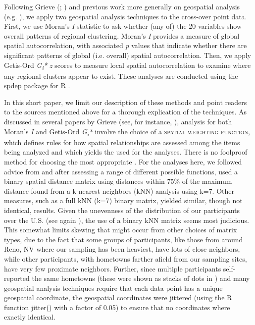 \documentclass[output=paper]{LSP/langsci}
\begin{document}
Following Grieve (\citealt{grieve_corpus-based_2009}; \citealt{grieve_statistical_2011,grieve_multivariate_2013}) and previous work more generally on geospatial analysis (e.g. \citealt{moran_notes_1950,ord_local_1995}), we apply two geospatial analysis techniques to the cross-over point data. First, we use Moran’s \textit{I} statistic to ask whether (any of) the 20 variables show overall patterns of regional clustering. Moran’s \textit{I }provides a measure of global spatial autocorrelation, with associated \textit{p} values that indicate whether there are significant patterns of global (i.e. overall) spatial autocorrelation. Then, we apply Getis-Ord \textit{G}\textit{\textsubscript{i}}\textit{*} \textit{z }scores to measure local spatial autocorrelation to examine where any regional clusters appear to exist. These analyses are conducted using the spdep package for R \citep{bivand_spdep._2014}.

In this short paper, we limit our description of these methods and point readers to the sources mentioned above for a thorough explication of the techniques. As discussed in several papers by Grieve (see, for instance, \citealt{grieve_comparison_2014}), analysis for both Moran’s \textit{I} and Getis-Ord \textit{G}\textit{\textsubscript{i}}\textit{*} involve the choice of a \textsc{spatial weighting function}, which defines rules for how spatial relationships are assessed among the items being analyzed and which yields the \textsc{} used for the analyses. There is no foolproof method for choosing the most appropriate . For the analyses here, we followed advice from \citet{bivand_creating_2014} and after assessing a range of different possible functions, used a binary spatial distance matrix using distances within 75\% of the maximum distance found from a k-nearest neighbors (kNN) analysis using k=7. Other measures, such as a full kNN (k=7) binary matrix, yielded similar, though not identical, results. Given the unevenness of the distribution of our participants over the U.S. (see again ), the use of a binary kNN matrix seems most judicious. This somewhat limits skewing that might occur from other choices of matrix types, due to the fact that some groups of participants, like those from around Reno, NV where our sampling has been heaviest, have lots of close neighbors, while other participants, with hometowns farther afield from our sampling sites, have very few proximate neighbors. Further, since multiple participants self-reported the same hometowns (these were shown as stacks of dots in ) and many geospatial analysis techniques require that each data point has a unique geospatial coordinate, the geospatial coordinates were jittered (using the R function jitter() with a factor of 0.05) to ensure that no coordinates where exactly identical.
\end{document}
